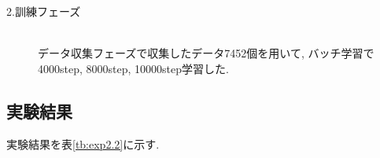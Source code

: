\begin{description}
  \item[2.訓練フェーズ]\mbox{}\\データ収集フェーズで収集したデータ7452個を用いて, バッチ学習で4000step, 8000step, 10000step学習した. 
\end{description}

\subsection{実験結果}
実験結果を表\ref{tb:exp2.2}に示す. 




